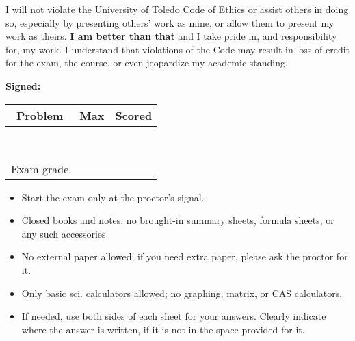 \documentclass[10pt,twoside,sfsidenotes]{tufte-handout}
\date{} %
\begin{document}
\setlength\abovedisplayskip{2pt}
\setlength\belowdisplayskip{2pt}
\setlength\abovedisplayshortskip{2pt}
\setlength\belowdisplayshortskip{2pt}

\vspace*{1in}


   {\large I will not violate the University of Toledo Code of Ethics or assist others in doing so, especially by presenting others' work as mine, or allow them to present my work as theirs. \textbf{I am better than that} and I take pride in, and responsibility for, my work. I understand that violations of the Code may result in loss of credit for the exam, the course, or even jeopardize my academic standing.

\vspace{.5in}

    \textbf{Signed:}
  }

  \vfill


\begin{center}\Large
  \begin{tabular}{c | c | c}
    Problem & Max & Scored \\ \hline
     & & \\ \hline
     & & \\ \hline
     & & \\ \hline
     & & \\ \hline
     & & \\ \hline
     & & \\ \hline
     & & \\ \hline
     & & \\ \hline
    Exam grade & & \\ \hline
  \end{tabular}
  \end{center}

  \vfill

  \begin{fullwidth}
{\large
  \begin{itemize}
    \item Start the exam only at the proctor's signal.
  \item Closed books and notes, no brought-in summary sheets, formula sheets, or any such accessories.
  \item No external paper allowed; if you need extra paper, please ask the proctor for it.
  \item Only basic sci. calculators allowed; no graphing, matrix, or CAS calculators.
  \item If needed, use both sides of each sheet for your answers. Clearly indicate where the answer is written, if it is not in the space provided for it.
  \end{itemize}
  }
\end{fullwidth}
\clearpage
\end{document}
